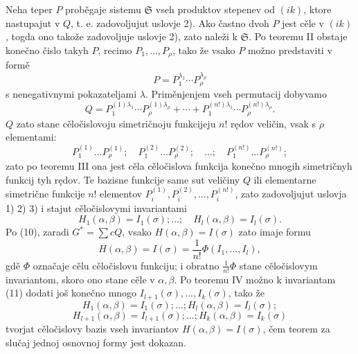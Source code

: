 \documentclass[11pt]{article}
\providecommand{\frS}{\mathfrak S}
\begin{document}
Neha teper \(P\) proběgaje sistemu \(\frS\) vseh produktov stepenev od \((ik)\), ktore nastupajut v \(Q\), t. e. zadovoljujut uslovje 2). Ako častno dvoh \(P\) jest cěle v \((ik)\), togda ono takože zadovoljuje uslovje 2), zato naleži k \(\frS\). Po teoremu II obstaje konečno čislo takyh \(P\), recimo \(P_1,\ldots,P_\rho\), tako že vsako \(P\) možno predstaviti v formě
\[
        P=P_1^{\lambda_1}\cdots P_\rho^{\lambda_\rho}
\]
s nenegativnymi pokazateljami \(\lambda\). Priměnjenjem vseh permutacij dobyvamo
\[
        Q=
        P_1^{(1)\lambda_1}\cdots P_\rho^{(1)\lambda_\rho}
        +\cdots+
        P_1^{(n!)\lambda_1}\cdots P_\rho^{(n!)\lambda_\rho}.
\]
\(Q\) zato stane cěločislovoju simetričnoju funkcijeju \(n!\) rędov veličin, vsak s \(\rho\) elementami:
\[
        P_1^{(1)}\ldots P_\rho^{(1)};
        \quad
        P_1^{(2)}\ldots P_\rho^{(2)};
        \quad \ldots;\quad
        P_1^{(n!)}\ldots P_\rho^{(n!)};
\]
zato po teoremu III ona jest cěla cěločislova funkcija konečno mnogih simetričnyh funkcij tyh rędov. Te bazisne funkcije same sut veličiny \(Q\) ili elementarne simetrične funkcije \(n!\) elementov \(P_i^{(1)},P_i^{(2)},\ldots,P_i^{(n!)}\), zato zadovoljujut uslovja 1) 2) 3) i stajut cěločislovymi invariantami
\begin{equation}
        H_1(\alpha,\beta)=I_1(\sigma);\ldots;\quad
        H_l(\alpha,\beta)=I_l(\sigma).
\end{equation}
Po (10), zaradi \(G^*=\sum cQ\), vsako \(H(\alpha,\beta)=I(\sigma)\) zato imaje formu
\[
        H(\alpha,\beta)=I(\sigma)=\frac1{n!}\Phi(I_1,\ldots,I_l),
\]
gdě \(\Phi\) označaje cělu cěločislovu funkciju; i obratno \(\frac1{n!}\Phi\) stane cěločislovym invariantom, skoro ono stane cěle v \(\alpha,\beta\). Po teoremu IV možno k invariantam (11) dodati još konečno mnogo \(I_{l+1}(\sigma),\ldots,I_k(\sigma)\), tako že
\[
        H_1(\alpha,\beta)=I_1(\sigma);\ldots;H_l(\alpha,\beta)=I_l(\sigma);
\]
\[
        H_{l+1}(\alpha,\beta)=I_{l+1}(\sigma);\ldots;H_k(\alpha,\beta)=I_k(\sigma)
\]
tvorjat cěločislovy bazis vseh invariantov \(H(\alpha,\beta)=I(\sigma)\), čem teorem za slučaj jednoj osnovnoj formy jest dokazan.
\end{document}
